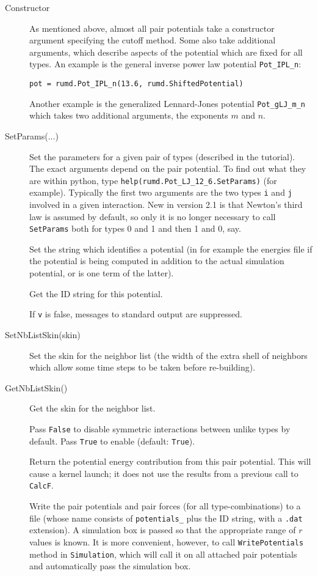 \documentclass[a4paper]{article}
\begin{document}
\begin{description}
\item [Constructor] As mentioned above, almost all pair potentials take a constructor argument specifying the cutoff method. Some also take additional arguments, which describe aspects of the potential which are fixed for all types. An example is the general inverse power law potential \verb|Pot_IPL_n|:

\begin{verbatim}
pot = rumd.Pot_IPL_n(13.6, rumd.ShiftedPotential)
\end{verbatim}
Another example is the generalized Lennard-Jones potential \verb|Pot_gLJ_m_n| which takes two additional arguments, the exponents $m$ and $n$.
\item [SetParams(...)] Set the parameters for a given pair of types (described 
in the tutorial). The exact arguments depend on the pair potential. To find out
what they are within python, type \verb|help(rumd.Pot_LJ_12_6.SetParams)|
(for example). Typically the first two arguments are the two types \verb|i| and
\verb|j| involved in a given interaction. New in version 2.1 is that Newton's 
third law is assumed by default, so only it is no longer necessary to call 
\verb|SetParams| both for types 0 and 1 and then 1 and 0, say.
\item [] Set the string which identifies a
 potential (in for example the energies file if the potential is being computed
 in addition to the actual simulation potential, or is one term of the latter).
\item [] Get the ID string for this potential.
\item [] If \verb|v| is false, messages to standard output are
 suppressed. 
\item [SetNbListSkin(skin)] Set the skin for the neighbor list (the width of 
the extra shell of neighbors which allow some time steps to be taken before 
re-building).
\item [GetNbListSkin()] Get the skin for the neighbor list.
\item [] Pass \verb|False| to disable symmetric 
interactions between unlike types by default. Pass \verb|True| to enable (default: 
\verb|True|).
\item [] Return the potential energy contribution from this
pair potential. This will cause a kernel launch; it does not use the results from
a previous call to \verb|CalcF|.
\item [] Write the pair potentials and pair forces 
(for all type-combinations) to a file 
(whose name consists of \verb|potentials_| plus the ID string, with a 
\verb|.dat| extension). A 
simulation box is passed so that the appropriate range of $r$ values is known.
It is more convenient, however, to call \verb|WritePotentials| method in 
\verb|Simulation|, which will call it on all attached pair potentials and 
automatically pass the simulation box.
\end{description}
\end{document}
